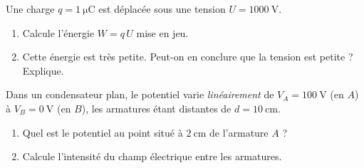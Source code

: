 \documentclass[11pt,a4paper]{article}
\begin{document}
\begin{exo}
Une charge $q = \SI{1}{\micro\coulomb}$ est déplacée sous une tension $U = \SI{1000}{\volt}$.
\begin{enumerate}[label=\alph*)]
  \item Calcule l'énergie $W = q\,U$ mise en jeu.
  \item Cette énergie est très petite. Peut-on en conclure que la tension est petite ? Explique.
\end{enumerate}
\end{exo}

\begin{exo}
Dans un condensateur plan, le potentiel varie \emph{linéairement} de $V_A = \SI{100}{\volt}$ (en $A$)
à $V_B = \SI{0}{\volt}$ (en $B$), les armatures étant distantes de $d = \SI{10}{\centi\metre}$.
\begin{center}
\end{center}
\begin{enumerate}[label=\alph*)]
  \item Quel est le potentiel au point situé à $\SI{2}{\centi\metre}$ de l'armature $A$ ?
  \item Calcule l'intensité du champ électrique entre les armatures.
\end{enumerate}
\end{exo}
\end{document}
